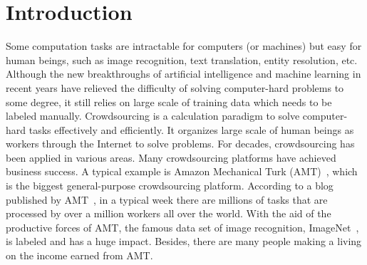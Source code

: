 \documentclass[11pt]{article}
\newcommand{\etc}{etc.\xspace}
\begin{document}
    


\section{Introduction}
Some computation tasks are intractable for computers (or machines) but easy for human beings, such as image recognition, text translation, entity resolution, \etc
Although the new breakthroughs of artificial intelligence and machine learning in recent years have relieved the difficulty of solving computer-hard problems to some degree, it still relies on large scale of training data which needs to be labeled manually.
Crowdsourcing is a calculation paradigm to solve computer-hard tasks effectively and efficiently.
It organizes large scale of human beings as workers through the Internet to solve problems.
For decades, crowdsourcing has been applied in various areas.
Many crowdsourcing platforms have achieved business success.
A typical example is Amazon Mechanical Turk (AMT)~, which is the biggest general-purpose crowdsourcing platform.
According to a blog published by AMT~, in a typical week there are millions of tasks that are processed by over a million workers all over the world.
With the aid of the productive forces of AMT, the famous data set of image recognition, ImageNet~, is labeled and has a huge impact.
Besides, there are many people making a living on the income earned from AMT.
\end{document}
